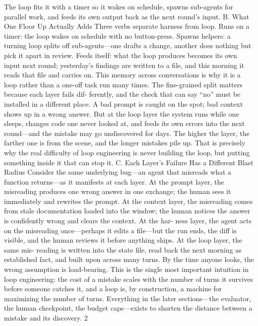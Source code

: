 \documentclass[conference]{IEEEtran}
\begin{document}
The loop fits it with a timer so it wakes on schedule, spawns
sub-agents for parallel work, and feeds its own output back as
the next round’s input.
B. What One Floor Up Actually Adds
Three verbs separate harness from loop. Runs on a timer: the
loop wakes on schedule with no button-press. Spawns helpers: a
turning loop splits off sub-agents—one drafts a change, another
does nothing but pick it apart in review. Feeds itself: what the
loop produces becomes its own input next round; yesterday’s
findings are written to a file, and this morning it reads that file
and carries on. This memory across conversations is why it is a
loop rather than a one-off task run many times.
The fine-grained split matters because each layer fails dif-
ferently, and the check that can say “no” must be installed in a
different place. A bad prompt is caught on the spot; bad context
shows up in a wrong answer. But at the loop layer the system
runs while one sleeps, changes code one never looked at, and
feeds its own errors into the next round—and the mistake may
go undiscovered for days. The higher the layer, the farther one is
from the scene, and the longer mistakes pile up. That is precisely
why the real difficulty of loop engineering is never building the
loop, but putting something inside it that can stop it.
C. Each Layer’s Failure Has a Different Blast Radius
Consider the same underlying bug—an agent that misreads
what a function returns—as it manifests at each layer. At the
prompt layer, the misreading produces one wrong answer in
one exchange; the human sees it immediately and rewrites the
prompt. At the context layer, the misreading comes from stale
documentation loaded into the window; the human notices the
answer is confidently wrong and clears the context. At the har-
ness layer, the agent acts on the misreading once—perhaps it
edits a file—but the run ends, the diff is visible, and the human
reviews it before anything ships. At the loop layer, the same mis-
reading is written into the state file, read back the next morning
as established fact, and built upon across many turns. By the
time anyone looks, the wrong assumption is load-bearing.
This is the single most important intuition in loop engineering:
the cost of a mistake scales with the number of turns it survives
before someone catches it, and a loop is, by construction, a
machine for maximizing the number of turns. Everything in the
later sections—the evaluator, the human checkpoint, the budget
caps—exists to shorten the distance between a mistake and its
discovery.
2
\end{document}
